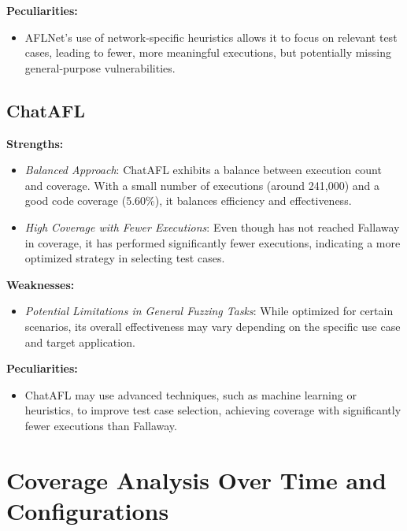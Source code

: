 \textbf{Peculiarities:}
\begin{itemize}
    \item AFLNet's use of network-specific heuristics allows it to focus on relevant test cases, leading to fewer, more meaningful executions, but potentially missing general-purpose vulnerabilities.
\end{itemize}

\subsection{ChatAFL}

\textbf{Strengths:}
\begin{itemize}
    \item \textit{Balanced Approach}: ChatAFL exhibits a balance between execution count and coverage. With a small number of executions (around 241,000) and a good code coverage (5.60\%), it balances efficiency and effectiveness.
    \item \textit{High Coverage with Fewer Executions}: Even though has not reached Fallaway in coverage, it has performed significantly fewer executions, indicating a more optimized strategy in selecting test cases.
\end{itemize}

\textbf{Weaknesses:}
\begin{itemize}
    \item \textit{Potential Limitations in General Fuzzing Tasks}: While optimized for certain scenarios, its overall effectiveness may vary depending on the specific use case and target application.
\end{itemize}

\textbf{Peculiarities:}
\begin{itemize}
    \item ChatAFL may use advanced techniques, such as machine learning or heuristics, to improve test case selection, achieving coverage with significantly fewer executions than Fallaway.
\end{itemize}

\section{Coverage Analysis Over Time and Configurations}

